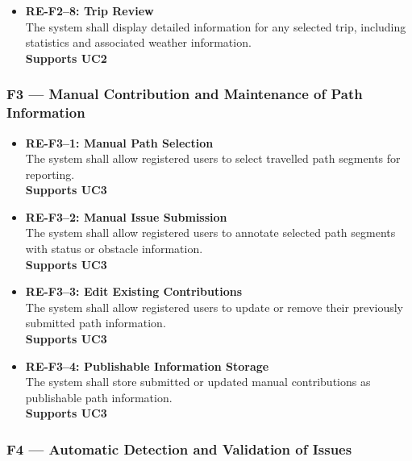 \begin{itemize}
    \item \textbf{RE-F2--8: Trip Review}\label{req:RE-F2-8}\\
    The system shall display detailed information for any selected trip, including statistics 
    and associated weather information.\\
    \textbf{Supports UC2}

\end{itemize}

\subsubsection*{F3 --- Manual Contribution and Maintenance of Path Information}\label{sec:F3}

\begin{itemize}

    \item \textbf{RE-F3--1: Manual Path Selection}\label{req:RE-F3-1}\\
    The system shall allow registered users to select travelled path segments for reporting.\\
    \textbf{Supports UC3}

    \item \textbf{RE-F3--2: Manual Issue Submission}\label{req:RE-F3-2}\\
    The system shall allow registered users to annotate selected path segments
    with status or obstacle information.\\
    \textbf{Supports UC3}

    \item \textbf{RE-F3--3: Edit Existing Contributions}\label{req:RE-F3-3}\\
    The system shall allow registered users to update or remove their previously submitted 
    path information.\\
    \textbf{Supports UC3}

    \item \textbf{RE-F3--4: Publishable Information Storage}\label{req:RE-F3-4}\\
    The system shall store submitted or updated manual contributions as publishable 
    path information.\\
    \textbf{Supports UC3}

\end{itemize}

\subsubsection*{F4 --- Automatic Detection and Validation of Issues}\label{sec:F4}


